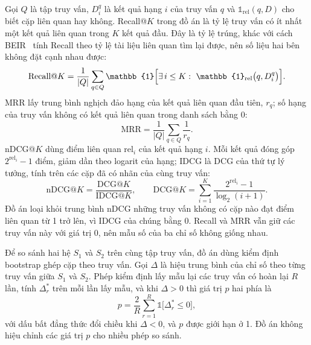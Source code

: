 Gọi $Q$ là tập truy vấn, $D^{q}_i$ là kết quả hạng $i$ của truy vấn $q$ và $\mathbb{1}_{\mathrm{rel}}(q,D)$ cho biết cặp liên quan hay không. Recall@$K$ trong đồ án là tỷ lệ truy vấn có ít nhất một kết quả liên quan trong $K$ kết quả đầu. Đây là tỷ lệ trúng, khác với cách BEIR~\cite{thakur2021beir} tính Recall theo tỷ lệ tài liệu liên quan tìm lại được, nên số liệu hai bên không đặt cạnh nhau được:
\begin{equation}
\mathrm{Recall@}K=\frac{1}{|Q|}\sum_{q\in Q}\mathbb{1}\Bigl[\exists\, i\le K:\ \mathbb{1}_{\mathrm{rel}}\bigl(q,D^{q}_i\bigr)\Bigr].
\label{eq:recall}
\end{equation}
MRR lấy trung bình nghịch đảo hạng của kết quả liên quan đầu tiên, $r_q$; số hạng của truy vấn không có kết quả liên quan trong danh sách bằng 0:
\begin{equation}
\mathrm{MRR}=\frac{1}{|Q|}\sum_{q\in Q}\frac{1}{r_q}.
\label{eq:mrr}
\end{equation}
nDCG@$K$ dùng điểm liên quan $\mathrm{rel}_i$ của kết quả hạng $i$. Mỗi kết quả đóng góp $2^{\mathrm{rel}_i}-1$ điểm, giảm dần theo logarit của hạng; IDCG là DCG của thứ tự lý tưởng, tính trên các cặp đã có nhãn của cùng truy vấn:
\begin{equation}
\mathrm{nDCG@}K=\frac{\mathrm{DCG@}K}{\mathrm{IDCG@}K},\qquad \mathrm{DCG@}K=\sum_{i=1}^{K}\frac{2^{\mathrm{rel}_i}-1}{\log_2(i+1)}.
\label{eq:ndcg}
\end{equation}
Đồ án loại khỏi trung bình nDCG những truy vấn không có cặp nào đạt điểm liên quan từ 1 trở lên, vì IDCG của chúng bằng 0. Recall và MRR vẫn giữ các truy vấn này với giá trị 0, nên mẫu số của ba chỉ số không giống nhau.

Để so sánh hai hệ $S_1$ và $S_2$ trên cùng tập truy vấn, đồ án dùng kiểm định bootstrap ghép cặp theo truy vấn. Gọi $\Delta$ là hiệu trung bình của chỉ số theo từng truy vấn giữa $S_1$ và $S_2$. Phép kiểm định lấy mẫu lại các truy vấn có hoàn lại $R$ lần, tính $\Delta^{*}_r$ trên mỗi lần lấy mẫu, và khi $\Delta>0$ thì giá trị $p$ hai phía là
\begin{equation}
p=\frac{2}{R}\sum_{r=1}^{R}\mathbb{1}\bigl[\Delta^{*}_r\le 0\bigr],
\label{eq:bootstrap}
\end{equation}
với dấu bất đẳng thức đổi chiều khi $\Delta<0$, và $p$ được giới hạn ở 1. Đồ án không hiệu chỉnh các giá trị $p$ cho nhiều phép so sánh.

